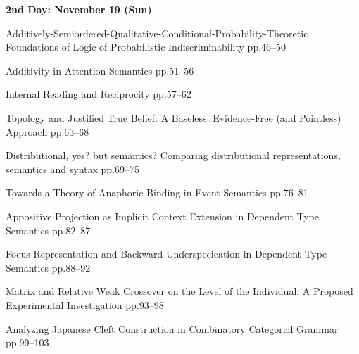 \documentclass[12pt]{jarticle}
\begin{document}
\noindent\textbf{\large 
2nd Day: November 19 (Sun)
}\\







  
     {Additively-Semiordered-Qualitative-Conditional-Probability-Theoretic Foundations of Logic of Probabilistic Indiscriminability}
     {pp.46--50}
  
     {Additivity in Attention Semantics}
     {pp.51--56}
  
     {Internal Reading and Reciprocity}
     {pp.57--62}




  
     {Topology and Justified True Belief: A Baseless, Evidence-Free (and Pointless) Approach}
     {pp.63--68}
  
     {Distributional, yes? but semantics? Comparing distributional representations, semantics and syntax}
     {pp.69--75}
  
     {Towards a Theory of Anaphoric Binding in Event Semantics}
     {pp.76--81}







  
     {Appositive Projection as Implicit Context Extension in Dependent Type Semantics}
     {pp.82--87}
  
     {Focus Representation and Backward Underspecication in Dependent Type Semantics}
     {pp.88--92}
  
     {Matrix and Relative Weak Crossover on the Level of the Individual: A Proposed Experimental Investigation}
     {pp.93--98}







  
     {Analyzing Japanese Cleft Construction in Combinatory Categorial Grammar}
     {pp.99--103}
  
\end{document}
